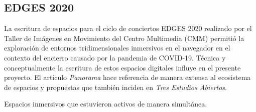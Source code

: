 \subsection{EDGES 2020}

La escritura de espacios para el ciclo de conciertos EDGES 2020 realizado por el Taller de Imágenes en Movimiento del Centro Multimedia (CMM) permitió la exploración de entornos tridimensionales inmersivos en el navegador en el contexto del encierro causado por la pandemia de COVID-19. Técnica y conceptualmente la escritura de estos espacios digitales influye en el presente proyecto. El artículo \textit{Panorama} \citep{panoramaArticulo} hace referencia de manera extensa al ecosistema de espacios y propuestas que también inciden en \textit{Tres Estudios Abiertos}.


Espacios inmersivos que estuvieron activos de manera simultánea. 

